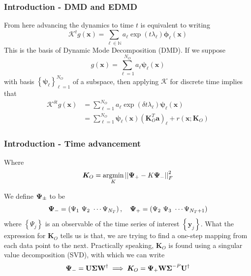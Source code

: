 \documentclass[11pt,aspectratio=169]{beamer}
\newcommand{\norm}[1]{\left|\left|#1\right|\right|}
\newcommand{\parens}[1]{\left(#1\right)}
\newcommand{\bracks}[1]{\left\{#1\right\}}
\newcommand{\N}{\mathbb{N}}
\begin{document}
    \begin{frame}
        \frametitle{Introduction - DMD and EDMD}
        From here advancing the dynamics to time $t$ is equivalent to writing
        \begin{equation}
            \mathcal{K}^{t} g(\boldsymbol{x}) = \sum_{\ell \in \N} a_\ell 
            \exp(t\lambda_\ell)\boldsymbol{\phi}_\ell (\boldsymbol{x})
        \end{equation} 
        This is the basis of Dynamic Mode Decomposition (DMD). If we suppose 
        \begin{equation}
            g(\boldsymbol{x}) = \sum_{\ell = 1}^{N_O} a_\ell \boldsymbol{\psi}_\ell
            (\boldsymbol{x}) 
        \end{equation}
        with basis $\bracks{\boldsymbol{\psi}_\ell}_{\ell=1}^{N_O}$ of a subspace, 
        then applying $\mathcal{K}$ for discrete time implies that
        \begin{align} 
            \mathcal{K}^{\delta t} g(\boldsymbol{x}) &= \sum_{\ell = 1}^{N_O} a_\ell 
            \exp(\delta t\lambda_\ell)\boldsymbol{\psi}_\ell (\boldsymbol{x}) \\
            &= \sum_{\ell = 1}^{N_O} \boldsymbol{\psi}_\ell (\boldsymbol{x})
            (\boldsymbol{K}_O^T
            \boldsymbol{a})_\ell + r(\boldsymbol{x};\boldsymbol{K}_O)
        \end{align}
    \end{frame}

    \begin{frame}
        \frametitle{Introduction - Time advancement}
        Where
        \begin{equation}
            \boldsymbol{K}_O = \underset{K}{\text{argmin}}\norm{{\bf\Psi}_+ - K{\bf\Psi}_-}_F^2
        \end{equation}

        We define ${\bf\Psi}_\pm$ to be
        \begin{equation}
            {\bf\Psi}_- = \parens{\Psi_1\ \Psi_2\ \cdots \Psi_{N_T}},\quad {\bf\Psi}_+ = \parens{
            \Psi_2\ \Psi_3\ \cdots \Psi_{N_T+1}} 
        \end{equation}
        where $\bracks{\Psi_j}$ is an observable of the time series of interest 
        $\bracks{\boldsymbol{y}_j}$. What the expression for $\boldsymbol{K}_O$ tells 
        us is that, we are trying to find a one-step mapping from each data point
        to the next. Practically speaking, $\boldsymbol{K}_O$ is found
        using a singular value decomposition (SVD), with which we can write
        \begin{equation}
            {\bf\Psi}_- = {\bf U\Sigma W}^{\dagger} \implies \boldsymbol{K}_O = 
            {\bf\Psi}_+{\bf W\Sigma}^{-P}{\bf U}^{\dagger}
        \end{equation}
    \end{frame}
\end{document}
